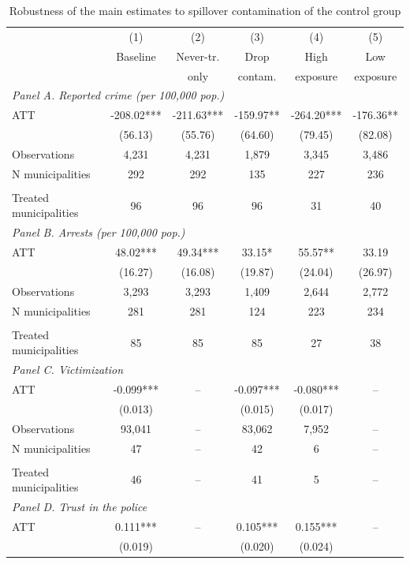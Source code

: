 \begin{table}[H]\centering
\caption{Robustness of the main estimates to spillover contamination of the control group}
\label{tab:test5_alternative}
\small
\begin{tabular}{l*{5}{c}}
\toprule
 & (1) & (2) & (3) & (4) & (5) \\
 & Baseline & Never-tr. & Drop & High & Low \\
 &  & only & contam. & exposure & exposure \\
\midrule
\multicolumn{6}{l}{\textit{Panel A. Reported crime (per 100,000 pop.)}} \\
ATT & -208.02*** & -211.63*** & -159.97** & -264.20*** & -176.36** \\
  & (56.13) & (55.76) & (64.60) & (79.45) & (82.08) \\
Observations & 4,231 & 4,231 & 1,879 & 3,345 & 3,486 \\
N municipalities & 292 & 292 & 135 & 227 & 236 \\\\
Treated municipalities & 96 & 96 & 96 & 31 & 40 \\
\midrule
\multicolumn{6}{l}{\textit{Panel B. Arrests (per 100,000 pop.)}} \\
ATT & 48.02*** & 49.34*** & 33.15* & 55.57** & 33.19 \\
  & (16.27) & (16.08) & (19.87) & (24.04) & (26.97) \\
Observations & 3,293 & 3,293 & 1,409 & 2,644 & 2,772 \\
N municipalities & 281 & 281 & 124 & 223 & 234 \\\\
Treated municipalities & 85 & 85 & 85 & 27 & 38 \\
\midrule
\multicolumn{6}{l}{\textit{Panel C. Victimization}} \\
ATT & -0.099*** & -- & -0.097*** & -0.080*** & -- \\
  & (0.013) &  & (0.015) & (0.017) &  \\
Observations & 93,041 & -- & 83,062 & 7,952 & -- \\
N municipalities & 47 & -- & 42 & 6 & -- \\\\
Treated municipalities & 46 & -- & 41 & 5 & -- \\
\midrule
\multicolumn{6}{l}{\textit{Panel D. Trust in the police}} \\
ATT & 0.111*** & -- & 0.105*** & 0.155*** & -- \\
  & (0.019) &  & (0.020) & (0.024) &  \\

\end{tabular}
\end{table}
